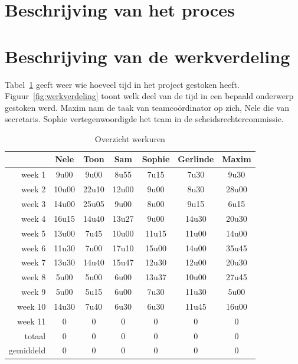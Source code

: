 \documentclass[eind]{penoverslag}
\begin{document}
\section{Beschrijving van het proces}
\label{Assec:beschrijvingProces}

\section{Beschrijving van de werkverdeling}
\label{Assec:werkverdeling}
Tabel~\ref{tab:werkuren} geeft weer wie hoeveel tijd in het project gestoken heeft. Figuur~\ref{fig:werkverdeling} toont welk deel van de tijd in een bepaald onderwerp gestoken werd.
Maxim nam de taak van teamco\"ordinator op zich, Nele die van secretaris. Sophie vertegenwoordigde het team in de scheidsrechtercommissie.

\begin{table}[h]
\begin{center}
    \begin{tabular}{ r | c  c  c  c  c  c}
     & Nele & Toon & Sam & Sophie & Gerlinde & Maxim \\ \hline
    week 1 & 9u00 & 9u00 & 8u55 & 7u15 & 7u30 & 9u30\\
   	week 2 & 10u00 & 22u10 & 12u00 & 9u00 & 8u30 & 28u00\\
	week 3 & 14u00 & 25u05 & 9u00 & 8u00 & 9u15 & 6u15\\
	week 4 & 16u15 & 14u40 & 13u27 & 9u00 & 14u30 & 20u30\\
	week 5 & 13u00 & 7u45 & 10u00 & 11u15 & 11u00 & 14u00\\
	week 6 & 11u30 & 7u00 & 17u10 & 15u00 & 14u00 & 35u45\\
	week 7 & 13u30 & 14u40 & 15u47 & 12u30 & 12u00 & 20u30\\
	week 8 & 5u00 & 5u00 & 6u00 & 13u37 & 10u00 & 27u45\\
	week 9 & 5u00 & 5u15 & 6u00 & 7u30 & 11u30 & 5u00\\
	week 10 & 14u30 & 7u40 & 6u30 & 6u30 & 11u45 & 16u00\\
	week 11 & 0 & 0 & 0 & 0 & 0 & 0\\ \hline
	totaal & 0 & 0 & 0 & 0 & 0 & 0 \\
	gemiddeld & 0 & 0 & 0 & 0 & 0 & 0
    \end{tabular}
    \caption{Overzicht werkuren}
    \label{tab:werkuren}
\end{center}
\end{table}
\end{document}
